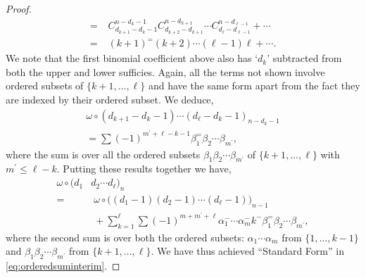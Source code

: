 \documentclass[5p,twocolumn]{elsarticle}
\begin{document}
\begin{proof}
\begin{align*}
                      =&\;C_{d_{k+1}-d_k-1}^{n-d_k-1}C_{d_{k+2}-d_{k+1}}^{n-d_{k+1}}\cdots C_{d_\ell-d_{\ell-1}}^{n-d_{\ell-1}}+\cdots\\
                      =&\;(k+1)^=(k+2)\cdots (\ell-1)\ell+\cdots.
  \end{align*}
  We note that the first binomial coefficient above also has `$d_k$' subtracted from both the upper and lower sufficies.  
  Again, all the terms not shown involve ordered subsets of $\{k+1,\ldots,\ell\}$ and have the same form apart from the fact they are indexed by their ordered subset.
  We deduce,
  \begin{multline*}
    \omega\circ(d_{k+1}-d_k-1)\cdots(d_\ell-d_k-1)_{n-d_k-1}\\ =\sum(-1)^{m^\prime+\ell-k-1}\beta_1^=\beta_2\cdots\beta_{m^\prime},
  \end{multline*}
  where the sum is over all the ordered subsets $\beta_1\beta_2\cdots\beta_{m^\prime}$ of $\{k+1,\ldots,\ell\}$ with $m^\prime\leqslant\ell-k$.
  Putting these results together we have,
  \begin{align}
    \omega\circ(d_1&d_2\cdots d_\ell)_n\nonumber\\
                  =&\;\omega\circ\bigl((d_1\!-\!1)(d_2\!-\!1)\cdots(d_\ell\!-\!1)\bigr)_{n-1}\nonumber\\  
                   &\;+\sum_{k=1}^\ell\sum(-1)^{m+m^\prime+\ell}\alpha_1^-\cdots\alpha_m^-k^-\beta_1^=\beta_2\cdots\beta_{m^\prime},\label{eq:orderedsuminterim}
  \end{align}
  where the second sum is over both the ordered subsets: $\alpha_1\cdots\alpha_m$ from $\{1,\ldots,k-1\}$ and $\beta_1\beta_2\cdots\beta_{m^\prime}$ from $\{k+1,\ldots,\ell\}$.
  We have thus achieved ``Standard Form'' in \eqref{eq:orderedsuminterim}. 
  

\end{proof}
\end{document}
